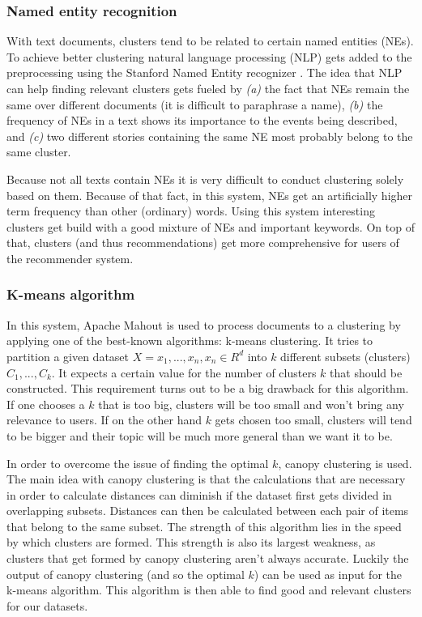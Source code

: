\documentclass[twocolumn,twoside,a4paper]{phdsymp} %
\begin{document}
\subsubsection{Named entity recognition}
With text documents, clusters tend to be related to certain named entities (NEs). To achieve better clustering natural language processing (NLP) gets added to the preprocessing using the Stanford Named Entity recognizer \cite{Manning2014} \cite{Montalvo2015}. The idea that NLP can help finding relevant clusters gets fueled by \textit{(a)} the fact that NEs remain the same over different documents (it is difficult to paraphrase a name),\textit{ (b)} the frequency of NEs in a text shows its importance to the events being described, and \textit{(c)} two different stories containing the same NE most probably belong to the same cluster. 

Because not all texts contain NEs it is very difficult to conduct clustering solely based on them. Because of that fact, in this system, NEs get an artificially higher term frequency than other (ordinary) words. Using this system interesting clusters get build with a good mixture of NEs and important keywords. On top of that, clusters (and thus recommendations) get more comprehensive for users of the recommender system.

\subsubsection{K-means algorithm}

In this system, Apache Mahout is used to process documents to a clustering by applying one of the best-known algorithms: k-means clustering. It tries to partition a given dataset $X = {x_1,...,x_n}, x_n \in R^d$ into $k$ different subsets (clusters) $C_1,...,C_k$. It expects a certain value for the number of clusters $k$ that should be constructed. This requirement turns out to be a big drawback for this algorithm. If one chooses a $k$ that is too big, clusters will be too small and won't bring any relevance to users. If on the other hand $k$ gets chosen too small, clusters will tend to be bigger and their topic will be much more general than we want it to be.

In order to overcome the issue of finding the optimal $k$, canopy clustering is used. The main idea with canopy clustering is that the calculations that are necessary in order to calculate distances can diminish if the dataset first gets divided in overlapping subsets. Distances can then be calculated between each pair of items that belong to the same subset. The strength of this algorithm lies in the speed by which clusters are formed. This strength is also its largest weakness, as clusters that get formed by canopy clustering aren't always accurate. Luckily the output of canopy clustering (and so the optimal $k$) can be used as input for the k-means algorithm. This algorithm is then able to find good and relevant clusters for our datasets.
\end{document}
